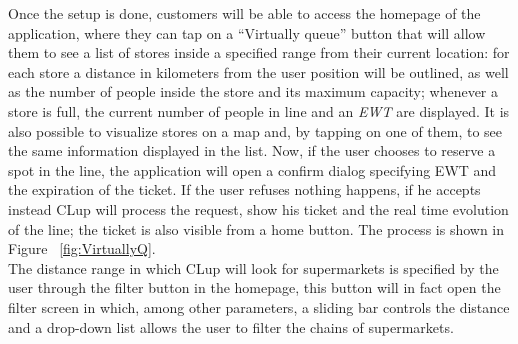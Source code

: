 Once the setup is done, customers will be able to access the homepage of the application, where they can tap on a “Virtually queue” button that will allow them to see a list of stores inside a specified range from their current location: for each store a distance in kilometers from the user position will be outlined, as well as the number of people inside the store and its maximum capacity; whenever a store is full, the current number of people in line and an \textit{EWT} are displayed.\newline  
It is also possible to visualize stores on a map and, by tapping on one of them, to see the same information displayed in the list. Now, if the user chooses to reserve a spot in the line, the application will open a confirm dialog specifying EWT and the expiration of the ticket. If the user refuses nothing happens, if he accepts instead CLup will process the request, show his ticket and the real time evolution of the line; the ticket is also visible from a home button. The process is shown in Figure ~\ref{fig:VirtuallyQ}.\\
The distance range in which CLup will look for supermarkets is specified by the user through the filter button in the homepage, this button will in fact open the filter screen in which, among other parameters, a sliding bar controls the distance and a drop-down list allows the user to filter the chains of supermarkets.\\

